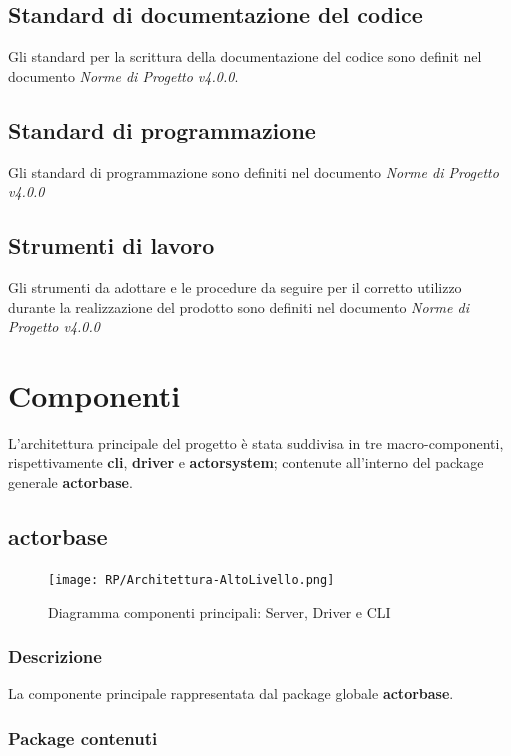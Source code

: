 \documentclass{scalatekids-article}
\begin{document}
\subsection{Standard di documentazione del codice}
Gli standard per la scrittura della documentazione del codice sono definit nel
documento \textit{Norme di Progetto v4.0.0}.

\subsection{Standard di programmazione}
Gli standard di programmazione sono definiti nel documento \textit{Norme di Progetto v4.0.0}

\subsection{Strumenti di lavoro}
Gli strumenti da adottare e le procedure da seguire per il corretto utilizzo
durante la realizzazione del prodotto sono definiti nel documento \textit{Norme
  di Progetto v4.0.0}

\section{Componenti}

L'architettura principale del progetto è stata suddivisa in tre macro-componenti, rispettivamente
\textbf{cli}, \textbf{driver} e \textbf{actorsystem}; contenute all'interno del package
generale \textbf{actorbase}.

\subsection{actorbase}
\label{sec:actorbase}

\begin{figure}[H]
  \begin{center}
    \texttt{[image: RP/Architettura-AltoLivello.png]}
    \caption{Diagramma componenti principali: Server, Driver e CLI}
  \end{center}
\end{figure}

\subsubsection{Descrizione}

La componente principale rappresentata dal package globale \textbf{actorbase}.

\subsubsection{Package contenuti}
\end{document}
